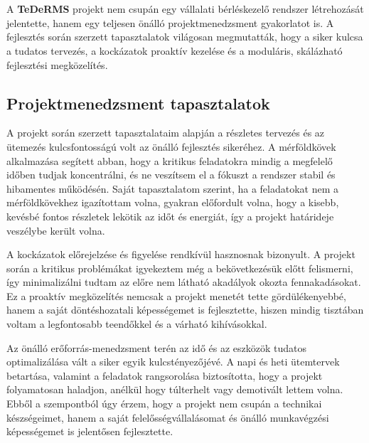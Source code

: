 \chapter{\lessons}

A \textbf{TeDeRMS} projekt nem csupán egy vállalati bérléskezelő rendszer létrehozását jelentette, 
hanem egy teljesen önálló projektmenedzsment gyakorlatot is. 
A fejlesztés során szerzett tapasztalatok világosan megmutatták, hogy a siker kulcsa a tudatos tervezés, 
a kockázatok proaktív kezelése és a moduláris, skálázható fejlesztési megközelítés.

\section{Projektmenedzsment tapasztalatok}

A projekt során szerzett tapasztalataim alapján a részletes tervezés és az ütemezés kulcsfontosságú volt
 az önálló fejlesztés sikeréhez. A mérföldkövek alkalmazása segített abban, hogy a kritikus feladatokra 
 mindig a megfelelő időben tudjak koncentrálni, és ne veszítsem el a fókuszt a rendszer stabil és hibamentes működésén. 
 Saját tapasztalatom szerint, ha a feladatokat nem a mérföldkövekhez igazítottam volna, gyakran előfordult volna, 
 hogy a kisebb, kevésbé fontos részletek lekötik az időt és energiát, így a projekt határideje veszélybe került volna.

A kockázatok előrejelzése és figyelése rendkívül hasznosnak bizonyult. A projekt során a kritikus problémákat 
igyekeztem még a bekövetkezésük előtt felismerni, így minimalizálni tudtam az előre nem látható akadályok okozta fennakadásokat. 
Ez a proaktív megközelítés nemcsak a projekt menetét tette gördülékenyebbé, hanem 
a saját döntéshozatali képességemet is fejlesztette, hiszen mindig tisztában voltam a legfontosabb teendőkkel és a várható kihívásokkal.

Az önálló erőforrás-menedzsment terén az idő és az eszközök tudatos optimalizálása 
vált a siker egyik kulcstényezőjévé. A napi és heti ütemtervek betartása, valamint a 
feladatok rangsorolása biztosította, hogy a projekt folyamatosan haladjon, anélkül hogy 
túlterhelt vagy demotivált lettem volna. Ebből a szempontból úgy érzem, hogy a projekt 
nem csupán a technikai készségeimet, hanem a saját felelősségvállalásomat és önálló munkavégzési képességemet is jelentősen fejlesztette.

